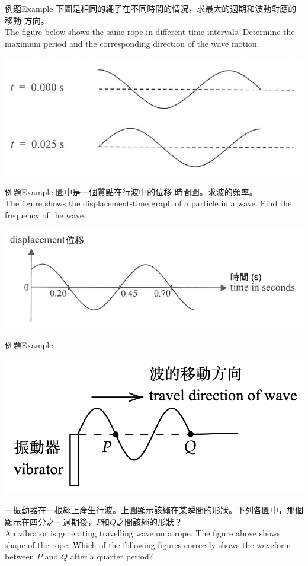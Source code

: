 \documentclass[beamer=true]{standalone}
\begin{document}
\begin{frame}[t]{例題Example}
    下圖是相同的繩子在不同時間的情況，求最大的週期和波動對應的移動
    方向。\\
    The figure below shows the same rope in different time intervals. Determine the maximum period and the corresponding direction of the wave motion.
    \bigskip
    \par{\par\centering\includegraphics[width=.7\textwidth]{./img/ch1_2024-05-08-16-37-34.png}\par}
\end{frame}

\begin{frame}[t]{例題Example}
    圖中是一個質點在行波中的位移-時間圖。求波的頻率。\\
    The figure shows the displacement-time graph of a particle in a wave. Find the frequency of the wave.
    \par{\par\centering\includegraphics[width=.66\textwidth]{./img/ch1_2024-05-08-16-40-38.png}\par}
\end{frame}

\begin{frame}[t]{例題Example}
    \par{\par\centering\includegraphics[width=.5\textwidth]{./img/ch1_2024-05-08-17-25-50.png}\par}\bigskip
    一振動器在一根繩上產生行波。上圖顯示該繩在某瞬間的形狀。下列各圖中，那個顯示在四分之一週期後，$P$和$Q$之間該繩的形狀？\\An vibrator is generating travelling wave on a rope. The figure above shows shape of the rope. Which of the following figures correctly shows the waveform between $P$ and $Q$ after a quarter period?
\end{frame}
\end{document}
